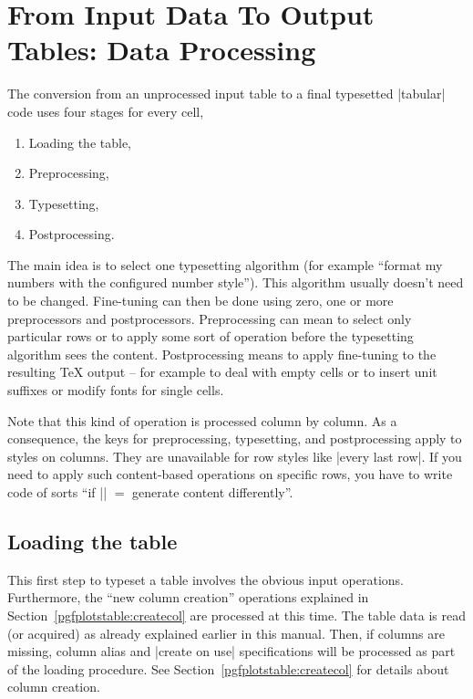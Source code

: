 \section[pgfplotstable-data-processing]{From Input Data To Output Tables: Data Processing}
\label{sec:data:processing}

The conversion from an unprocessed input table to a final typesetted |tabular|
code uses four stages for every cell,
%
\begin{enumerate}
    \item Loading the table,
    \item Preprocessing,
    \item Typesetting,
    \item Postprocessing.
\end{enumerate}
%
The main idea is to select one typesetting algorithm (for example ``format my
numbers with the configured number style''). This algorithm usually doesn't
need to be changed. Fine-tuning can then be done using zero, one or more
preprocessors and postprocessors. Preprocessing can mean to select only
particular rows or to apply some sort of operation before the typesetting
algorithm sees the content. Postprocessing means to apply fine-tuning to the
resulting \TeX{} output -- for example to deal with empty cells or to insert
unit suffixes or modify fonts for single cells.

Note that this kind of operation is processed column by column. As a
consequence, the keys for preprocessing, typesetting, and postprocessing apply
to styles on columns. They are unavailable for row styles like
|every last row|. If you need to apply such content-based operations on
specific rows, you have to write code of sorts ``if |\pgfplotstablerow| $=$
generate content differently''.


\subsection{Loading the table}

This first step to typeset a table involves the obvious input operations.
Furthermore, the ``new column creation'' operations explained in
Section~\ref{pgfplotstable:createcol} are processed at this time. The table
data is read (or acquired) as already explained earlier in this manual. Then,
if columns are missing, column alias and |create on use| specifications will be
processed as part of the loading procedure. See
Section~\ref{pgfplotstable:createcol} for details about column creation.


